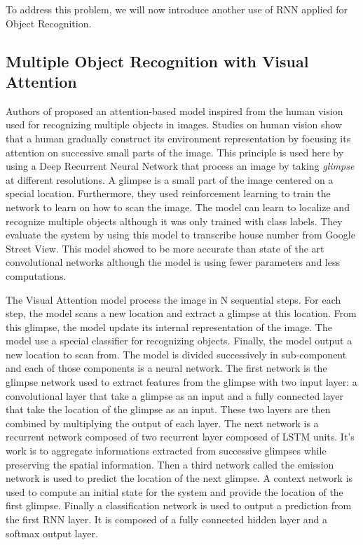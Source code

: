 \documentclass[11pt]{sdm}
\begin{document}
To address this problem, we will now introduce another use of RNN applied for Object Recognition.

\subsection{Multiple Object Recognition with Visual Attention}

Authors of \cite{ba_multiple_2014} proposed an attention-based model inspired from the human vision used for recognizing multiple objects in images.
Studies on human vision show that a human gradually construct its environment representation by focusing its attention on successive small parts of the image.
This principle is used here by using a Deep Recurrent Neural Network that process an image by taking \textit{glimpse} at different resolutions.
A glimpse is a small part of the image centered on a special location.
Furthermore, they used reinforcement learning to train the network to learn on how to scan the image.
The model can learn to localize and recognize multiple objects although it was only trained with class labels.
They evaluate the system by using this model to transcribe house number from Google Street View.
This model showed to be more accurate than state of the art convolutional networks although the model is using fewer parameters and less computations.

The Visual Attention model process the image in N sequential steps.
For each step, the model scans a new location and extract a glimpse at this location.
From this glimpse, the model update its internal representation of the image.
The model use a special classifier for recognizing objects.
Finally, the model output a new location to scan from.
The model is divided successively in sub-component and each of those components is a neural network.
The first network is the glimpse network used to extract features from the glimpse with two input layer: a convolutional layer that take a glimpse as an input and a fully connected layer that take the location of the glimpse as an input.
These two layers are then combined by multiplying the output of each layer.
The next network is a recurrent network composed of two recurrent layer composed of LSTM units.
It's work is to aggregate informations extracted from successive glimpses while preserving the spatial information.
Then a third network called the emission network is used to predict the location of the next glimpse.
A context network is used to compute an initial state for the system and provide the location of the first glimpse.
Finally a classification network is used to output a prediction from the first RNN layer.
It is composed of a fully connected hidden layer and a softmax output layer.
\end{document}
